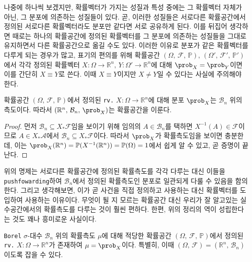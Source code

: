 나중에 하나씩 보겠지만, 확률벡터가 가지는 성질과 특성 중에는 그 확률벡터 자체가 아닌, 그 분포에 의존하는 성질들이 있다. 곧, 이러한 성질들은 서로다른 확률공간에서 정의된 서로다른 확률벡터라도 분포만 같다면 서로 공유하게 된다. 이를 뒤집어 생각하면 때로는 하나의 확률공간에 정의된 확률벡터를 그 분포에 의존하는 성질들을 그대로 유지하면서 다른 확률공간으로 옮길 수도 있다. 이러한 이유로 분포가 같은 확률벡터를 다루게 되는 경우가 많고, 표기의 편의를 위해 확률공간 $(\Omega,\,\mathcal{F},\,\mathbb{P}),\,(\Omega',\,\mathcal{F}',\,\mathbb{P}')$에서 각각 정의된 확률벡터 $X:\Omega\to\mathbb{R}^n,\,Y:\Omega'\to\mathbb{R}^n$에 대해 $\prob_X=\prob_Y$이면 이를 간단히 $X\equiv Y$로 쓴다. 이때 $X\equiv Y$이지만 $X\ne Y$일 수 있다는 사실에 주의해야 한다.

\begin{proposition}\label{prop:rvProbSpace}
    확률공간 $(\Omega,\,\mathcal{F},\,\mathbb{P})$에서 정의된 \texttt{rv.} $X:\Omega\to\mathbb{R}^n$에 대해 분포 $\prob_X$는 $\mathcal{B}_n$ 위의 측도이다. 따라서 $(\mathbb{R}^n,\,\mathcal{B}_n,\,\prob_X)$는 확률공간을 이룬다.
\end{proposition}

\begin{proof}
    먼저 $\mathcal{B}_n\subseteq X_*\mathcal{F}$임을 보이기 위해 임의의 $A\in\mathcal{B}_n$를 택하면 $X^{-1}(A)\in\mathcal{F}$이므로 $A\in X_*\mathcal{A}$에서 $\mathcal{B}_n\subseteq X_*\mathcal{F}$이다. 따라서 $\prob_X$가 확률측도임을 보이면 충분한데, 이는 $\prob_X(\mathbb{R}^n)=\mathbb{P}(X^{-1}(\mathbb{R}^n))=\mathbb{P}(\Omega)=1$에서 쉽게 알 수 있고, 곧 증명이 끝난다.
\end{proof}

위의 명제는 서로다른 확률공간에 정의된 확률측도를 각각 다루는 대신 이들을 \texttt{pushfowarding}하여 $\mathcal{B}_n$에서 정의된 확률측도인 분포로 일관되게 다룰 수 있음을 함의한다. 그리고 생각해보면, 이가 곧 사건을 직접 정의하고 사용하는 대신 확률벡터를 도입하여 사용하는 이유이다. 무엇이 될 지 모르는 확률공간 대신 우리가 잘 알고있는 실수공간에서의 확률측도를 다루는 것이 훨씬 편하다. 한편, 위의 정리의 역이 성립한다는 것도 꽤나 흥미로운 사실이다.

\begin{theorem}\label{thm:probSpaceRv}
    \texttt{Borel} $\sigma$-대수 $\mathcal{B}_n$ 위의 확률측도 $\mu$에 대해 적당한 확률공간 $(\Omega,\,\mathcal{F},\,\mathbb{P})$에서 정의된 \texttt{rv.} $X:\Omega\to\mathbb{R}^n$가 존재하여 $\mu=\prob_X$이다. 특별히, 이때 $(\Omega,\,\mathcal{F})=(\mathbb{R}^n,\,\mathcal{B}_n)$이도록 잡을 수 있다.
\end{theorem}

